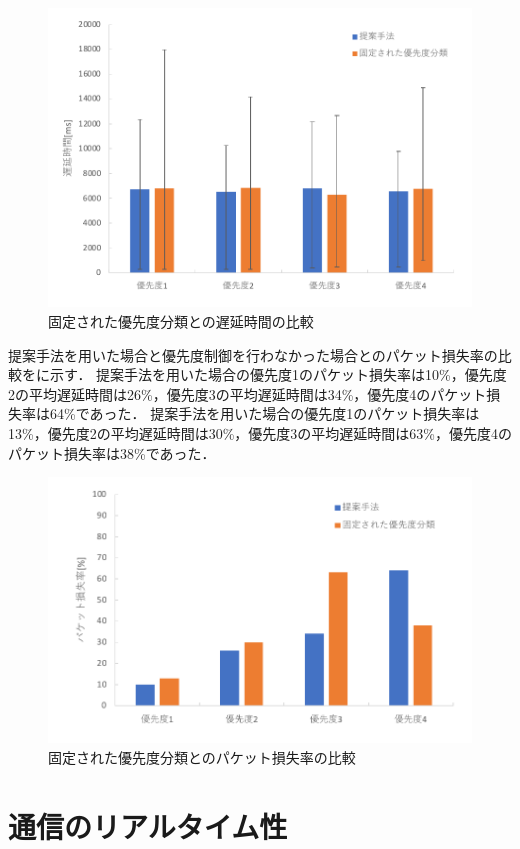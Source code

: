 \documentclass[a4paper,11pt,uplatex]{ujreport}
\begin{document}
  \begin{figure}[!b]
    \centering
    \includegraphics[width=0.85\linewidth]{img/RTT_2.pdf}
    \caption{固定された優先度分類との遅延時間の比較}
    \label{fig:RTT_2}
  \end{figure}

  提案手法を用いた場合と優先度制御を行わなかった場合とのパケット損失率の比較をに示す．
  提案手法を用いた場合の優先度1のパケット損失率は10\%，優先度2の平均遅延時間は26\%，優先度3の平均遅延時間は34\%，優先度4のパケット損失率は64\%であった．
  提案手法を用いた場合の優先度1のパケット損失率は13\%，優先度2の平均遅延時間は30\%，優先度3の平均遅延時間は63\%，優先度4のパケット損失率は38\%であった．

  \begin{figure}[!b]
    \centering
    \includegraphics[width=0.85\linewidth]{img/packetloss_2.pdf}
    \caption{固定された優先度分類とのパケット損失率の比較}
    \label{fig:packetloss_2}
  \end{figure}

\section{通信のリアルタイム性}
\label{sec:通信のリアルタイム性}
\end{document}
